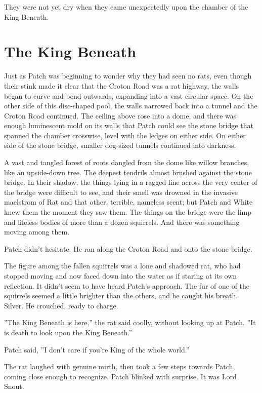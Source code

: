 \documentclass[12pt]{book}
\begin{document}
They were not yet dry when they came unexpectedly upon the chamber of the King Beneath.


\section{The King Beneath}

Just as Patch was beginning to wonder why they had seen no rats, even though their stink made it clear that the Croton Road was a rat highway, the walls began to curve and bend outwards, expanding into a vast circular space. On the other side of this disc-shaped pool, the walls narrowed back into a tunnel and the Croton Road continued. The ceiling above rose into a dome, and there was enough luminescent mold on its walls that Patch could see the stone bridge that spanned the chamber crosswise, level with the ledges on either side. On either side of the stone bridge, smaller dog-sized tunnels continued into darkness.

A vast and tangled forest of roots dangled from the dome like willow branches, like an upside-down tree. The deepest tendrils almost brushed against the stone bridge. In their shadow, the things lying in a ragged line across the very center of the bridge were difficult to see, and their smell was drowned in the invasive maelstrom of Rat and that other, terrible, nameless scent; but Patch and White knew them the moment they saw them. The things on the bridge were the limp and lifeless bodies of more than a dozen squirrels. And there was something moving among them.

Patch didn't hesitate. He ran along the Croton Road and onto the stone bridge.

The figure among the fallen squirrels was a lone and shadowed rat, who had stopped moving and now faced down into the water as if staring at its own reflection. It didn't seem to have heard Patch's approach. The fur of one of the squirrels seemed a little brighter than the others, and he caught his breath. Silver. He crouched, ready to charge.

''The King Beneath is here,'' the rat said coolly, without looking up at Patch. ''It is death to look upon the King Beneath.''

Patch said, ''I don't care if you're King of the whole world.''

The rat laughed with genuine mirth, then took a few steps towards Patch, coming close enough to recognize. Patch blinked with surprise. It was Lord Snout.
\end{document}
